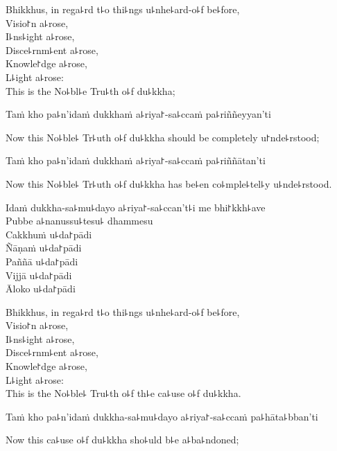\begin{english}
  Bhikkhus, in rega꜕rd t꜕o thi꜕ngs u꜕nhe꜕ard-o꜕f be꜕fore,\\
  Visio꜓n a꜕rose,\\
  I꜕ns꜕ight a꜕rose,\\
  Disce꜕rnm꜕ent a꜕rose,\\
  Knowle꜓dge a꜕rose,\\
  L꜕ight a꜕rose:\\
  This is the No꜕bl꜕e Tru꜕th o꜕f du꜕kkha;
\end{english}

Taṁ kho pa꜕n'idaṁ dukkhaṁ a꜕riya꜓-sa꜕ccaṁ pa꜕riññeyyan'ti

\begin{english}
  Now this No꜕ble꜕ Tr꜕uth o꜕f du꜕kkha should be completely u꜓nde꜕rstood;
\end{english}

Taṁ kho pa꜕n'idaṁ dukkhaṁ a꜕riya꜓-sa꜕ccaṁ pa꜕riññātan'ti

\begin{english}
  Now this No꜕ble꜕ Tr꜕uth o꜕f du꜕kkha has be꜕en co꜕mple꜕tel꜕y u꜕nde꜕rstood.
\end{english}

\ifaivedition
\clearpage
\fi

Idaṁ dukkha-sa꜕mu꜕dayo a꜕riya꜓-sa꜕ccan't꜕i me bhi꜓kkh꜕ave\\
Pubbe a꜕nanussu꜕tesu꜕ dhammesu\\
Cakkhuṁ u꜕da꜓pādi\\
Ñāṇaṁ u꜕da꜓pādi\\
Paññā u꜕da꜓pādi\\
Vijjā u꜕da꜓pādi\\
Āloko u꜕da꜓pādi

\begin{english}
  Bhikkhus, in rega꜕rd t꜕o thi꜕ngs u꜕nhe꜕ard-o꜕f be꜕fore,\\
  Visio꜓n a꜕rose,\\
  I꜕ns꜕ight a꜕rose,\\
  Disce꜕rnm꜕ent a꜕rose,\\
  Knowle꜓dge a꜕rose,\\
  L꜕ight a꜕rose:\\
  This is the No꜕ble꜕ Tru꜕th o꜕f th꜕e ca꜕use o꜕f du꜕kkha.
\end{english}

Taṁ kho pa꜕n'idaṁ dukkha-sa꜕mu꜕dayo a꜕riya꜓-sa꜕ccaṁ pa꜕hāta꜕bban'ti

\begin{english}
  Now this ca꜕use o꜕f du꜕kkha sho꜕uld b꜕e a꜕ba꜕ndoned;
\end{english}

